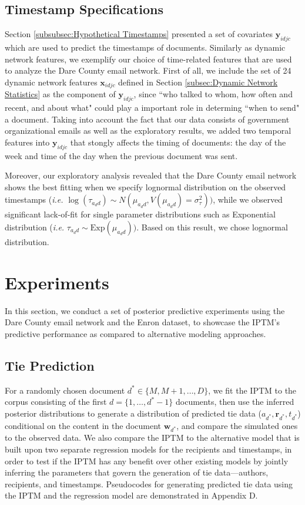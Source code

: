 \documentclass[twoside]{article}
\begin{document}
\subsection{Timestamp Specifications}\label{subsec:Timestamp Specifications}
Section \ref{subsubsec:Hypothetical Timestamps} presented a set of covariates $\boldsymbol{y}_{idjc}$ which are used to predict the timestamps of documents. Similarly as dynamic network features, we exemplify our choice of time-related features that are used to analyze the Dare County email network. First of all, we include the set of 24 dynamic network features $\boldsymbol{x}_{idjc}$ defined in Section \ref{subsec:Dynamic Network Statistics} as the component of $\boldsymbol{y}_{idjc}$, since ``who talked to whom, how often and recent, and about what" could play a important role in determing ``when to send" a document. Taking into account the fact that our data consists of government organizational emails as well as the exploratory results, we added two temporal features into $\boldsymbol{y}_{idjc}$ that stongly affects the timing of documents: the day of the week and time of the day when the previous document was sent. 

Moreover, our exploratory analysis revealed that the Dare County email network shows the best fitting when we specify lognormal distribution on the observed timestamps (\textit{i.e.} $\log(\tau_{a_dd}) \sim N(\mu_{a_d d}, V(\mu_{a_d d}) = \sigma^2_\tau))$, while we observed significant lack-of-fit for single parameter distributions such as Exponential distribution (\textit{i.e.} $\tau_{a_dd} \sim \mbox{Exp}(\mu_{a_d d}))$. Based on this result, we chose lognormal distribution. 

\section{Experiments}\label{sec:Experiments}
In this section, we conduct a set of posterior predictive experiments using the Dare County email network and the Enron dataset, to showcase the IPTM's predictive performance as compared to alternative modeling approaches.
\subsection{Tie Prediction}\label{subsec:Tie Prediction}
 For a randomly chosen document $d^* \in \{M, M+1,\ldots, D\}$, we fit the IPTM to the corpus consisting of the first $d = \{1,\hdots,d^*-1\}$ documents, then use the inferred posterior distributions to generate a distribution of predicted tie data ($a_{d^*}, \boldsymbol{r}_{d^*}, t_{d^*}$) conditional on the content in the document   $\boldsymbol{w}_{d^*}$, and compare the simulated ones to the observed data. We also compare the IPTM to the alternative model that is built upon two separate regression models for the recipients and timestamps, in order to test if the IPTM has any benefit over other existing models by jointly inferring the parameters that govern the generation of tie data---authors, recipients, and timestamps. Pseudocodes for generating predicted tie data using the IPTM and the regression model are demonstrated in Appendix D.
 
\end{document}

